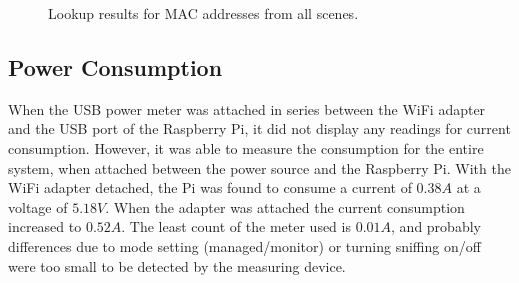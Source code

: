 \begin{figure}[h!]
    \centering
    
    
    \caption{Lookup results for MAC addresses from all scenes.}
    \label{fig:vendor_stats}
\end{figure}

\subsection{Power Consumption}

When the USB power meter was attached in series between the WiFi adapter and the USB port of the Raspberry Pi, it did not display any readings for current consumption. However, it was able to measure the consumption for the entire system, when attached between the power source and the Raspberry Pi. With the WiFi adapter detached, the Pi was found to consume a current of $0.38A$ at a voltage of $5.18V$. When the adapter was attached the current consumption increased to $0.52A$. The least count of the meter used is $0.01A$, and probably differences due to mode setting (managed/monitor) or turning sniffing on/off were too small to be detected by the measuring device.
